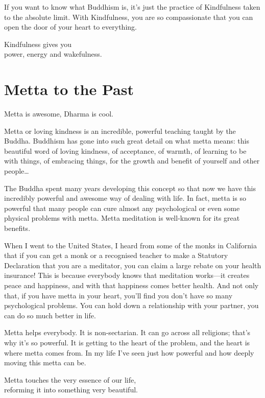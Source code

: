 \documentclass[12pt, openany]{book}
\newenvironment{aphorism}%
{%
\begin{center}\begin{itshape}
}%
{\end{itshape}\end{center}
}%
\newcommand{\fleuron}{%
\begin{center}
\vspace{2em}
\fallbackfont{❦}
\end{center}
}
\begin{document}
If you want to know what Buddhism is, it’s just the practice of Kindfulness taken to the absolute limit. With Kindfulness, you are so compassionate that you can open the door of your heart to everything. 

\begin{aphorism}
Kindfulness gives you\\  
power, energy and wakefulness.
\end{aphorism}

\fleuron

\chapter{Metta to the Past} 

Metta is awesome, Dharma is cool. 🤩

Metta or loving kindness is an incredible, powerful teaching taught by the Buddha. Buddhism has gone into such great detail on what metta means: this beautiful word of loving kindness, of acceptance, of warmth, of learning to be with things, of embracing things, for the growth and benefit of yourself and other people… 

The Buddha spent many years developing this concept so that now we have this incredibly powerful and awesome way of dealing with life. In fact, metta is so powerful that many people can cure almost any psychological or even some physical problems with metta. Metta meditation is well-known for its great benefits. 

When I went to the United States, I heard from some of the monks in California that if you can get a monk or a recognised teacher to make a Statutory Declaration that you are a meditator, you can claim a large rebate on your health insurance! This is because everybody knows that meditation works—it creates peace and happiness, and with that happiness comes better health. And not only that, if you have metta in your heart, you’ll find you don’t have so many psychological problems. You can hold down a relationship with your partner, you can do so much better in life. 

Metta helps everybody. It is non-sectarian. It can go across all religions; that’s why it’s so powerful. It is getting to the heart of the problem, and the heart is where metta comes from. In my life I’ve seen just how powerful and how deeply moving this metta can be. 

\begin{aphorism}
Metta touches the very essence of our life,\\  
reforming it into something very beautiful.
\end{aphorism}
\end{document}
